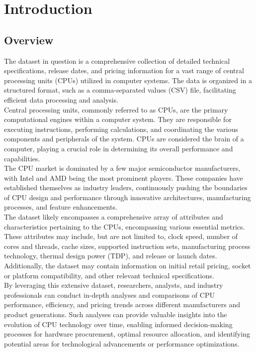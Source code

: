 \section{Introduction}
\subsection*{Overview}

The dataset in question is a comprehensive collection of detailed technical specifications, release dates, and pricing information for a vast range of central processing units (CPUs) utilized in computer systems. The data is organized in a structured format, such as a comma-separated values (CSV) file, facilitating efficient data processing and analysis.\\

Central processing units, commonly referred to as CPUs, are the primary computational engines within a computer system. They are responsible for executing instructions, performing calculations, and coordinating the various components and peripherals of the system. CPUs are considered the brain of a computer, playing a crucial role in determining its overall performance and capabilities.\\

The CPU market is dominated by a few major semiconductor manufacturers, with Intel and AMD being the most prominent players. These companies have established themselves as industry leaders, continuously pushing the boundaries of CPU design and performance through innovative architectures, manufacturing processes, and feature enhancements.\\

The dataset likely encompasses a comprehensive array of attributes and characteristics pertaining to the CPUs, encompassing various essential metrics. These attributes may include, but are not limited to, clock speed, number of cores and threads, cache sizes, supported instruction sets, manufacturing process technology, thermal design power (TDP), and release or launch dates. Additionally, the dataset may contain information on initial retail pricing, socket or platform compatibility, and other relevant technical specifications.\\

By leveraging this extensive dataset, researchers, analysts, and industry professionals can conduct in-depth analyses and comparisons of CPU performance, efficiency, and pricing trends across different manufacturers and product generations. Such analyses can provide valuable insights into the evolution of CPU technology over time, enabling informed decision-making processes for hardware procurement, optimal resource allocation, and identifying potential areas for technological advancements or performance optimizations.\\

